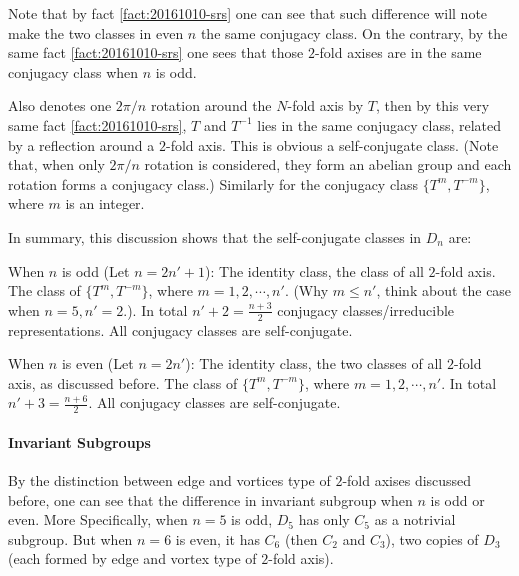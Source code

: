 Note that by fact \ref{fact:20161010-srs} one can see that such
difference will note make the two classes in even $n$ the same
conjugacy class. On the contrary, by the same fact
\ref{fact:20161010-srs} one sees that those $2$-fold axises are in the
same conjugacy class when $n$ is odd.

Also denotes one $2\pi/n$ rotation around the $N$-fold axis by $T$,
then by this very same fact \ref{fact:20161010-srs}, $T$ and $T^{-1}$
lies in the same conjugacy class, related by a reflection around a
$2$-fold axis. This is obvious a self-conjugate class. (Note that,
when only $2\pi/n$ rotation is considered, they form an abelian group
and each rotation forms a conjugacy class.) Similarly for the
conjugacy class $\{T^m, T^{-m}\}$, where $m$ is an integer.

In summary, this discussion shows that the self-conjugate classes in $D_n$
are:
\begin{fact}
    When $n$ is odd (Let $n=2n'+1$): The identity class, the class of
    all $2$-fold axis. The class of $\{ T^m, T^{-m}\}$, where
    $m=1,2,\cdots, n'$. (Why $m\leq n'$, think about the case when
    $n=5,n'=2$.). In total $n'+2=\frac{n+3}{2}$ conjugacy
    classes/irreducible representations. All conjugacy classes are
    self-conjugate.
\end{fact}
\begin{fact}
    When $n$ is even (Let $n=2n'$): The identity class, the two
    classes of all $2$-fold axis, as discussed before. The class of
    $\{ T^m, T^{-m}\}$, where $m=1,2,\cdots, n'$. In total
    $n'+3=\frac{n+6}{2}$. All conjugacy classes are self-conjugate.
\end{fact}

\paragraph{Invariant Subgroups}
By the distinction between edge and vortices type of $2$-fold axises
discussed before, one can see that the difference in invariant
subgroup when $n$ is odd or even. More Specifically, when $n=5$ is odd,
$D_5$ has only $C_5$ as a notrivial subgroup. But when
$n=6$ is even, it has $C_6$ (then $C_2$ and $C_3$), two copies of
$D_3$ (each formed by edge and vortex type of $2$-fold axis).
